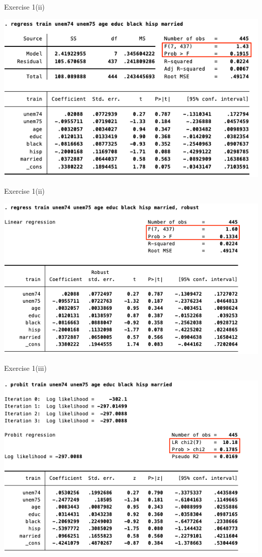\documentclass[
  10pt,
  ignorenonframetext,
]{beamer}
\begin{document}
\begin{frame}{Exercise 1(ii)}
\protect\hypertarget{LMPtrain_norobust}{}
\begin{center}\includegraphics[width=0.9\linewidth]{pictures/LMPtrain_norobust} \end{center}
\end{frame}

\begin{frame}{Exercise 1(ii)}
\protect\hypertarget{LMPtrain}{}
\begin{center}\includegraphics[width=0.9\linewidth]{pictures/LMPtrain} \end{center}
\end{frame}

\begin{frame}{Exercise 1(iii)}
\protect\hypertarget{PROBITtrain}{}
\begin{center}\includegraphics[width=0.9\linewidth]{pictures/PROBITtrain} \end{center}
\end{frame}
\end{document}
